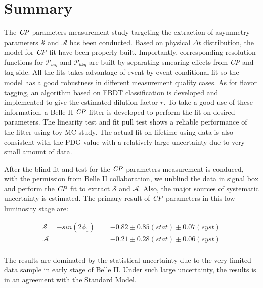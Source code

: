 \section{Summary}
The $\it{CP}$ parameters measurement study targeting the extraction of asymmetry parameters $\mathcal{S}$ and $\mathcal{A}$ has been conducted. Based on physical $\Delta t$ distribution, the model for $\it{CP}$ fit have been properly built. Importantly, corresponding resolution functions for $\mathcal{P}_{sig}$ and $\mathcal{P}_{bkg}$ are built by separating smearing effects from \textit{CP} and tag side. All the fits takes advantage of event-by-event conditional fit so the model has a good robustness in different measurement quality cases. As for flavor tagging, an algorithm based on FBDT classification is developed and implemented to give the estimated dilution factor $r$. To take a good use of these information, a Belle II $\it{CP}$ fitter is developed to perform the fit on desired parameters. The linearity test and fit pull test shows a reliable performance of the fitter using toy MC study. The actual fit on lifetime using data is also consistent with the PDG value with a relatively large uncertainty due to very small amount of data. 

After the blind fit and test for the $\it{CP}$ parameters measurement is conduced, with the permission from Belle II collaboration, we unblind the data in signal box and perform the $\it{CP}$ fit to extract $\mathcal{S}$ and $\mathcal{A}$. Also, the major sources of systematic uncertainty is estimated. The primary result of $\it{CP}$ parameters in this low luminosity stage are:

\begin{equation}
\begin{split}
\mathcal{S}=- sin(2\phi_1) & = -0.82 \pm 0.85(stat) \pm 0.07(syst) \\
\mathcal{A} & = -0.21\pm 0.28(stat) \pm 0.06(syst)\\
\end{split}
\end{equation}  

The results are dominated by the statistical uncertainty due to the very limited data sample in early stage of Belle II. Under such large uncertainty, the results is in an agreement with the Standard Model. 


